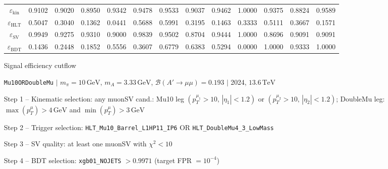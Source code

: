 \documentclass[10pt,a4paper]{article}
\begin{document}
\begin{landscape}
{\begin{tabular}{c|cccc|cccc|cccc}
\midrule
$\varepsilon_{\mathrm{kin}}$ & 0.9102 & 0.9020 & 0.8950 & 0.9342 & 0.9478 & 0.9533 & 0.9037 & 0.9462 & 1.0000 & 0.9375 & 0.8824 & 0.9589\\
$\varepsilon_{\mathrm{HLT}}$ & 0.5047 & 0.3040 & 0.1362 & 0.0441 & 0.5688 & 0.5991 & 0.3195 & 0.1463 & 0.3333 & 0.5111 & 0.3667 & 0.1571\\
$\varepsilon_{\mathrm{SV}}$ & 0.9949 & 0.9275 & 0.9310 & 0.9000 & 0.9839 & 0.9502 & 0.8704 & 0.9444 & 1.0000 & 0.8696 & 0.9091 & 0.9091\\
$\varepsilon_{\mathrm{BDT}}$ & 0.1436 & 0.2448 & 0.1852 & 0.5556 & 0.3607 & 0.6779 & 0.6383 & 0.5294 & 0.0000 & 1.0000 & 0.9333 & 1.0000\\
\bottomrule
\end{tabular}}

\end{landscape}
\clearpage

{\large Signal efficiency cutflow

 \texttt{Mu10ORDoubleMu} $|$ $m_{\pi}=10\,\mathrm{GeV}$, $m_{A}=3.33\,\mathrm{GeV}$, $\mathcal{B}(A'\!\to\!\mu\mu)=0.193$ $|$ 2024, $13.6\,\mathrm{TeV}$}

\vspace{0.8em}

Step 1 -- Kinematic selection: any muonSV cand.: Mu10 leg $(p_T^{\mu_1}{>}10,\,|\eta_1|{<}1.2)$ or $(p_T^{\mu_2}{>}10,\,|\eta_2|{<}1.2)$; DoubleMu leg: $\max(p_T^{\mu}){>}4\,\mathrm{GeV}$ and $\min(p_T^{\mu}){>}3\,\mathrm{GeV}$

Step 2 -- Trigger selection: \texttt{HLT\_Mu10\_Barrel\_L1HP11\_IP6} OR \texttt{HLT\_DoubleMu4\_3\_LowMass}

Step 3 -- SV quality: at least one muonSV with $\chi^2<10$

Step 4 -- BDT selection: \texttt{xgb01\_NOJETS} $>0.9971$ (target FPR $=10^{-4}$)

\vspace{0.8em}
\end{document}
